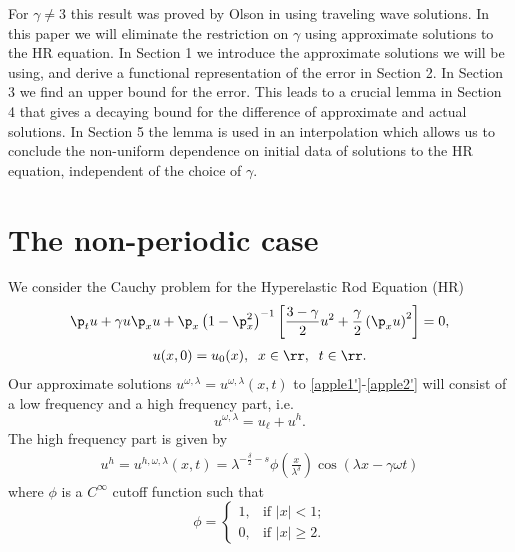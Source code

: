 	For $\gamma \neq 3$ this result was proved by Olson in
  \cite{Olson_2006_The-initial-val} using
	traveling wave solutions. In this paper
	we will eliminate the restriction on $\gamma$ using approximate solutions to the HR
	equation. In Section 1 we introduce the approximate
	solutions we will be using, and derive a functional representation of
	the error in Section 2. In Section 3 we find an upper bound for the
	error. This leads to a crucial lemma in Section 4 that gives a
	decaying bound for the difference of approximate and actual solutions.
	In Section 5 the lemma is used in an interpolation which allows us to 
	conclude the non-uniform dependence on initial
	data of solutions to the HR equation, independent of the choice of 
	$\gamma$.
\section{The non-periodic case}
We consider the Cauchy problem for the Hyperelastic Rod Equation (HR)
\begin{equation}
	\begin{split}
		\p_t u + \gamma u \p_x u + \p_x \left( 1 - \p_x^2
		\right)^{-1}  \left[ \frac{3-\gamma}{2}u^2 +
		\frac{\gamma}{2} \left( \p_x u \right)^2
		\right] = 0,
		\label{apple1'}
	\end{split}
\end{equation}
%
\begin{equation}
	\begin{split}
		u(x,0) = u_0(x), \; \; x \in \rr, \; \; t \in \rr. 
		\label{apple2'}
	\end{split}
\end{equation}
Our approximate solutions $u^{\omega, \lambda} = u^{\omega,
\lambda}(x,t)$ to \eqref{apple1'}-\eqref{apple2'} will
consist of a low frequency and a high frequency part,
i.e.
\begin{equation}
	\label{apple1}
	u^{\omega,\lambda} = u_\ell + u^h.
\end{equation}
The high frequency part is given by 
\begin{equation}
	\begin{split}
		u^h = u^{h,\omega,\lambda}(x,t) =
		\lambda^{-\frac{\delta}{2} -s}
		\phi \left (\frac{x}{\lambda^\delta}\right )
		\cos(\lambda x - \gamma \omega t)
	\end{split}
\end{equation}
where $\phi$ is a $C^\infty$ cutoff function such that
\begin{equation*}
	\phi = 
	\begin{cases}
		1, &\text{if $|x|<1$;} \\
		0, &\text{if $|x| \ge 2$.} 
	\end{cases}
\end{equation*}
